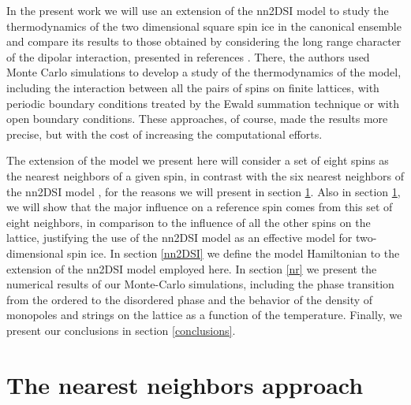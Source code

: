 \documentclass[aps,showkeys,groupedaddress]{revtex4}
\begin{document}
In the present work we will use an extension of the nn2DSI model to study the thermodynamics of the two dimensional square spin ice in the canonical ensemble and compare its results to those obtained by considering the long range character of the dipolar interaction, presented in references \cite{Silva2012,Li2013}. There, the authors used Monte Carlo simulations to develop a study of the thermodynamics of the model, including the interaction between all the pairs of spins on finite lattices, with periodic boundary conditions treated by the Ewald summation technique \cite{Zuowei2001} or with open boundary conditions. These approaches, of course, made the results more precise, but with the cost of increasing the computational efforts. 

The extension of the model we present here will consider a set of eight spins as the nearest neighbors of a given spin, in contrast with the six nearest neighbors of the nn2DSI model \cite{Xie2015}, for the reasons we will present in section \ref{sri}. Also in section \ref{sri}, we will show that the major influence on a reference spin comes from this set of eight neighbors, in comparison to the influence of all the other spins on the lattice, justifying the use of the nn2DSI model as an effective model for two-dimensional spin ice. In section \ref{nn2DSI} we define the model Hamiltonian to the extension of the nn2DSI model employed here. In section \ref{nr} we present the numerical results of our Monte-Carlo simulations, including the phase transition from the ordered to the disordered phase and the behavior of the density of monopoles and strings on the lattice as a function of the temperature. Finally, we present our conclusions in section \ref{conclusions}.


\section{The nearest neighbors approach} \label{sri}
\end{document}
